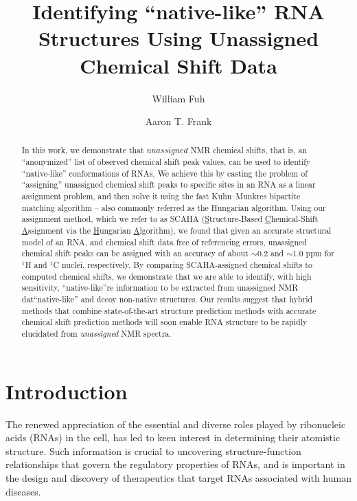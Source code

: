 \documentclass[journal=jcisd8,manuscript=article,layout=onecolumn]{achemso}
\author{William Fuh}
\author{Aaron T. Frank}
\affiliation{Departments of Biophysics and Chemistry, University of Michigan, 930 North University Avenue, Ann Arbor, Michigan 48109, USA}
\title[Title]
 {Identifying ``native-like'' RNA Structures Using Unassigned Chemical Shift Data}
\begin{document}
\begin{abstract}
In this work, we demonstrate that $\textit{unassigned}$ NMR chemical shifts, that is, an  ``anonymized'' list of observed chemical shift peak values, can be used to identify ``native-like'' conformations of RNAs.  We achieve this by casting the problem of ``assigning''  unassigned chemical shift peaks to specific sites in an RNA as a linear assignment problem, and then solve it using the fast Kuhn--Munkres  bipartite matching algorithm -- also commonly referred as the Hungarian algorithm. Using our assignment method, which we refer to as SCAHA (\underline{S}tructure-Based \underline{C}hemical-Shift \underline{A}ssignment via the \underline{H}ungarian \underline{A}lgorithm), we found that given an accurate structural model of an RNA, and chemical shift data free of referencing errors, unassigned chemical shift peaks can be assigned with an accuracy of about $\sim$0.2 and $\sim$1.0 ppm for $^{1}$H and  $^{1}$C nuclei, respectively.  By comparing SCAHA-assigned chemical shifts to computed chemical shifts, we demonstrate that we are able to identify, with high sensitivity,  ``native-like''re information to be extracted from unassigned NMR dat``native-like'' and decoy non-native structures. Our results suggest that hybrid methods that combine state-of-the-art structure prediction methods with accurate chemical shift prediction methods will soon enable RNA structure to be rapidly elucidated from \textit{unassigned} NMR spectra.
\end{abstract}
 
\section{Introduction}
The renewed appreciation of the essential and diverse roles played by ribonucleic acids (RNAs) in the cell\cite{encode2012integrated}, has led to keen interest in determining their atomistic structure. Such information is crucial to uncovering structure-function relationships that govern the regulatory properties of RNAs, and is important in the design and discovery of therapeutics that target RNAs associated with human diseases\cite{cooper2009rna}. 
\end{document}
